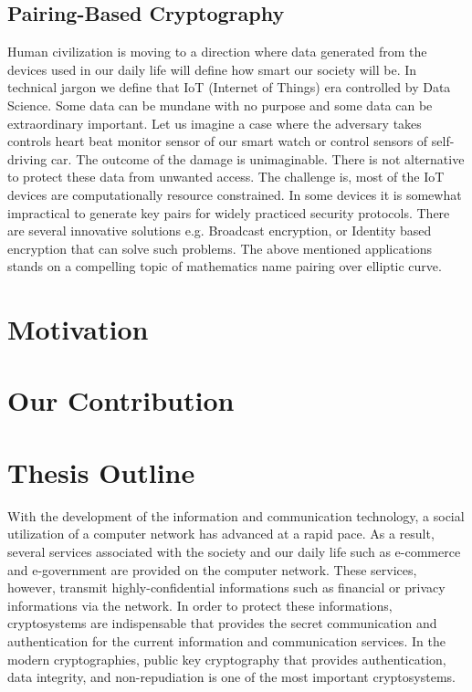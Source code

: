 \subsection{Pairing-Based Cryptography}
\label{ch1_subsec_pbc}
Human civilization is moving to a direction where data generated from the devices used in our daily life will define how smart our society will be.
In technical jargon we define that IoT (Internet of Things) era controlled by Data Science.
Some data can be mundane with no purpose and some data can be extraordinary important.
Let us imagine a case where the adversary takes controls heart beat monitor sensor of our smart watch or control sensors of self-driving car.
The outcome of the damage is unimaginable. 
There is not alternative to protect these data from unwanted access.
The challenge is, most of the IoT devices are computationally resource constrained.
In some devices it is somewhat impractical to generate key pairs for widely practiced security protocols.
There are several innovative solutions e.g. Broadcast encryption, or Identity based encryption that can solve such problems.
The above mentioned applications stands on a compelling topic of mathematics name pairing over elliptic curve.

\section{Motivation}
\label{ch1_sec_motivation}

\section{Our Contribution}
\label{ch1_sec_contribution}


\section{Thesis Outline}
\label{ch1_sec_outline}

With  the development of the information and communication technology, a social utilization of a computer network has advanced at a rapid pace.
As a result, several services associated with the society and our daily life such as e-commerce and e-government are provided on the computer network.
These services, however, transmit highly-confidential informations such as financial or privacy informations via the network.
In order to protect these informations, cryptosystems are indispensable that provides the secret communication and authentication for the current information and communication services.
In the modern cryptographies, public key cryptography that provides authentication, data integrity, and non-repudiation is one of the most important cryptosystems.

